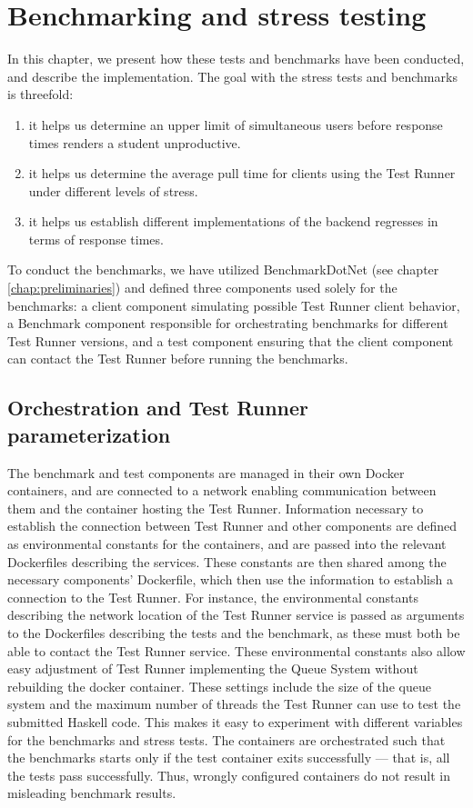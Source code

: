 \section{Benchmarking and stress testing} \label{chap:Benchmarking}
In this chapter, we present how these tests and benchmarks have been conducted, and describe the implementation. 
The goal with the stress tests and benchmarks is threefold: 
\begin{enumerate}
\item it helps us determine an upper limit of simultaneous users before response times renders a student unproductive.
\item it helps us determine the average pull time for clients using the Test Runner under different levels of stress.
\item it helps us establish different implementations of the backend regresses in terms of response times.
\end{enumerate}
To conduct the benchmarks, we have utilized BenchmarkDotNet (see chapter \ref{chap:preliminaries}) and defined three components used solely for the benchmarks:
a client component simulating possible Test Runner client behavior, a Benchmark component responsible for orchestrating benchmarks for different Test Runner versions, and a test component ensuring that the client component can contact the Test Runner before running the benchmarks.

\subsection{Orchestration and Test Runner parameterization}
The benchmark and test components are managed in their own Docker containers, and are connected to a network enabling communication between them and the container hosting the Test Runner. 
Information necessary to establish the connection between Test Runner and other components are defined as environmental constants for the containers, and are passed into the relevant Dockerfiles describing the services.
These constants are then shared among the necessary components' Dockerfile, which then use the information to establish a connection to the Test Runner.
For instance, the environmental constants describing the network location of the Test Runner service is passed as arguments to the Dockerfiles describing the tests and the benchmark, as these must both be able to contact the Test Runner service.
These environmental constants also allow easy adjustment of Test Runner implementing the Queue System without rebuilding the docker container.
These settings include the size of the queue system and the maximum number of threads the Test Runner can use to test the submitted Haskell code.
This makes it easy to experiment with different variables for the benchmarks and stress tests.  
The containers are orchestrated such that the benchmarks starts only if the test container exits successfully --- that is, all the tests pass successfully. 
Thus, wrongly configured containers do not result in misleading benchmark results.

